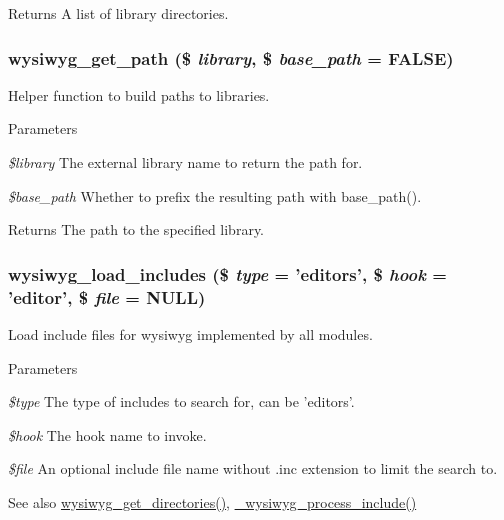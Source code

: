 \begin{DoxyReturn}{Returns}
A list of library directories. 
\end{DoxyReturn}
\hypertarget{group__wysiwyg__api_ga328c8919e7a4bb96cf7a19f098313319}{
\subsubsection[{wysiwyg\_\-get\_\-path}]{\setlength{\rightskip}{0pt plus 5cm}wysiwyg\_\-get\_\-path (\$ {\em library}, \/  \$ {\em base\_\-path} = {\ttfamily FALSE})}}
\label{group__wysiwyg__api_ga328c8919e7a4bb96cf7a19f098313319}
Helper function to build paths to libraries.


\begin{DoxyParams}{Parameters}
\item[{\em \$library}]The external library name to return the path for. \item[{\em \$base\_\-path}]Whether to prefix the resulting path with base\_\-path().\end{DoxyParams}
\begin{DoxyReturn}{Returns}
The path to the specified library. 
\end{DoxyReturn}
\hypertarget{group__wysiwyg__api_gae5880da976120e85f7bb8aeda815b060}{
\subsubsection[{wysiwyg\_\-load\_\-includes}]{\setlength{\rightskip}{0pt plus 5cm}wysiwyg\_\-load\_\-includes (\$ {\em type} = {\ttfamily 'editors'}, \/  \$ {\em hook} = {\ttfamily 'editor'}, \/  \$ {\em file} = {\ttfamily NULL})}}
\label{group__wysiwyg__api_gae5880da976120e85f7bb8aeda815b060}
Load include files for wysiwyg implemented by all modules.


\begin{DoxyParams}{Parameters}
\item[{\em \$type}]The type of includes to search for, can be 'editors'. \item[{\em \$hook}]The hook name to invoke. \item[{\em \$file}]An optional include file name without .inc extension to limit the search to.\end{DoxyParams}
\begin{DoxySeeAlso}{See also}
\hyperlink{group__wysiwyg__api_ga47660e98db185a3c9de431b94e280977}{wysiwyg\_\-get\_\-directories()}, \hyperlink{group__wysiwyg__api_ga81487ce9ea49d7ca7b052bb8f2e8fcc8}{\_\-wysiwyg\_\-process\_\-include()} 
\end{DoxySeeAlso}
